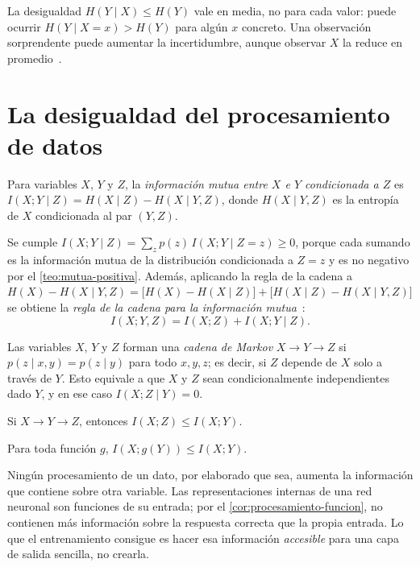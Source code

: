 \begin{observacion}
La desigualdad $H(Y\mid X)\le H(Y)$ vale en media, no para cada valor: puede ocurrir $H(Y\mid X=x)>H(Y)$ para algún $x$ concreto. Una observación sorprendente puede aumentar la incertidumbre, aunque observar $X$ la reduce en promedio~\cite[§2.6]{ct}.
\end{observacion}

\addtocounter{figure}{1}%

\addtocounter{definicion}{1}%

\addtocounter{definicion}{1}%

\section{La desigualdad del procesamiento de datos}

\begin{definicion}
Para variables $X$, $Y$ y $Z$, la \emph{información mutua entre $X$ e $Y$ condicionada a $Z$} es $I(X;Y\mid Z)=H(X\mid Z)-H(X\mid Y,Z)$, donde $H(X\mid Y,Z)$ es la entropía de $X$ condicionada al par $(Y,Z)$.
\end{definicion}

Se cumple $I(X;Y\mid Z)=\sum_z p(z)\,I(X;Y\mid Z=z)\ge 0$, porque cada sumando es la información mutua de la distribución condicionada a $Z=z$ y es no negativo por el \cref{teo:mutua-positiva}. Además, aplicando la regla de la cadena a $H(X)-H(X\mid Y,Z)=\bigl[H(X)-H(X\mid Z)\bigr]+\bigl[H(X\mid Z)-H(X\mid Y,Z)\bigr]$ se obtiene la \emph{regla de la cadena para la información mutua}~\cite[§2.5]{ct}:
\[
I(X;Y,Z)=I(X;Z)+I(X;Y\mid Z).
\]

\begin{definicion}
Las variables $X$, $Y$ y $Z$ forman una \emph{cadena de Markov} $X\to Y\to Z$ si $p(z\mid x,y)=p(z\mid y)$ para todo $x,y,z$; es decir, si $Z$ depende de $X$ solo a través de $Y$. Esto equivale a que $X$ y $Z$ sean condicionalmente independientes dado $Y$, y en ese caso $I(X;Z\mid Y)=0$.
\end{definicion}

\begin{teorema}\label{teo:procesamiento}
Si $X\to Y\to Z$, entonces $I(X;Z)\le I(X;Y)$.
\end{teorema}

\begin{corolario}\label{cor:procesamiento-funcion}
Para toda función $g$, $I(X;g(Y))\le I(X;Y)$.
\end{corolario}

\begin{observacion}
Ningún procesamiento de un dato, por elaborado que sea, aumenta la información que contiene sobre otra variable. Las representaciones internas de una red neuronal son funciones de su entrada; por el \cref{cor:procesamiento-funcion}, no contienen más información sobre la respuesta correcta que la propia entrada. Lo que el entrenamiento consigue es hacer esa información \emph{accesible} para una capa de salida sencilla, no crearla.
\end{observacion}

